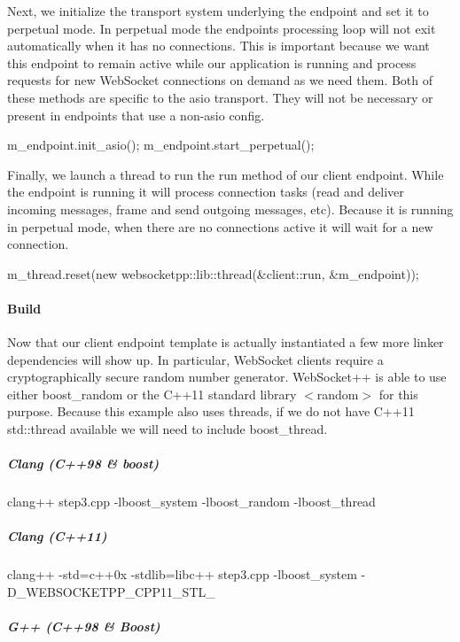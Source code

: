 Next, we initialize the transport system underlying the endpoint and set it to perpetual mode. In perpetual mode the endpoint\textquotesingle{}s processing loop will not exit automatically when it has no connections. This is important because we want this endpoint to remain active while our application is running and process requests for new Web\+Socket connections on demand as we need them. Both of these methods are specific to the asio transport. They will not be necessary or present in endpoints that use a non-\/asio config. 
\begin{DoxyCode}
m\_endpoint.init\_asio();
m\_endpoint.start\_perpetual();
\end{DoxyCode}


Finally, we launch a thread to run the {\ttfamily run} method of our client endpoint. While the endpoint is running it will process connection tasks (read and deliver incoming messages, frame and send outgoing messages, etc). Because it is running in perpetual mode, when there are no connections active it will wait for a new connection. 
\begin{DoxyCode}
m\_thread.reset(\textcolor{keyword}{new} websocketpp::lib::thread(&client::run, &m\_endpoint));
\end{DoxyCode}


\paragraph*{Build}

Now that our client endpoint template is actually instantiated a few more linker dependencies will show up. In particular, Web\+Socket clients require a cryptographically secure random number generator. Web\+Socket++ is able to use either {\ttfamily boost\+\_\+random} or the C++11 standard library $<$random$>$ for this purpose. Because this example also uses threads, if we do not have C++11 std\+::thread available we will need to include {\ttfamily boost\+\_\+thread}.

\subparagraph*{Clang (C++98 \& boost)}

{\ttfamily clang++ step3.\+cpp -\/lboost\+\_\+system -\/lboost\+\_\+random -\/lboost\+\_\+thread}

\subparagraph*{Clang (C++11)}

{\ttfamily clang++ -\/std=c++0x -\/stdlib=libc++ step3.\+cpp -\/lboost\+\_\+system -\/\+D\+\_\+\+W\+E\+B\+S\+O\+C\+K\+E\+T\+P\+P\+\_\+\+C\+P\+P11\+\_\+\+S\+T\+L\+\_\+}

\subparagraph*{G++ (C++98 \& Boost)}

